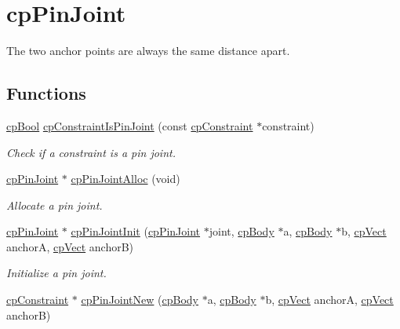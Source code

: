 \hypertarget{group__cp_pin_joint}{}\section{cp\+Pin\+Joint}
\label{group__cp_pin_joint}


The two anchor points are always the same distance apart.  


\subsection*{Functions}
\begin{DoxyCompactItemize}
\item 
\hypertarget{group__cp_pin_joint_ga1bfadaf29642d5a71302cf958e4969cb}{}\hyperlink{group__basic_types_gabc5e752c48f3449ca26ef413ecbd647e}{cp\+Bool} \hyperlink{group__cp_pin_joint_ga1bfadaf29642d5a71302cf958e4969cb}{cp\+Constraint\+Is\+Pin\+Joint} (const \hyperlink{structcp_constraint}{cp\+Constraint} $\ast$constraint)\label{group__cp_pin_joint_ga1bfadaf29642d5a71302cf958e4969cb}

\begin{DoxyCompactList}\small\item\em Check if a constraint is a pin joint. \end{DoxyCompactList}\item 
\hypertarget{group__cp_pin_joint_ga12e5fcaa7d39e47e6f1ac9777744fec5}{}\hyperlink{structcp_pin_joint}{cp\+Pin\+Joint} $\ast$ \hyperlink{group__cp_pin_joint_ga12e5fcaa7d39e47e6f1ac9777744fec5}{cp\+Pin\+Joint\+Alloc} (void)\label{group__cp_pin_joint_ga12e5fcaa7d39e47e6f1ac9777744fec5}

\begin{DoxyCompactList}\small\item\em Allocate a pin joint. \end{DoxyCompactList}\item 
\hypertarget{group__cp_pin_joint_ga0f7cc8d23e3bc0695086d44447efd95c}{}\hyperlink{structcp_pin_joint}{cp\+Pin\+Joint} $\ast$ \hyperlink{group__cp_pin_joint_ga0f7cc8d23e3bc0695086d44447efd95c}{cp\+Pin\+Joint\+Init} (\hyperlink{structcp_pin_joint}{cp\+Pin\+Joint} $\ast$joint, \hyperlink{structcp_body}{cp\+Body} $\ast$a, \hyperlink{structcp_body}{cp\+Body} $\ast$b, \hyperlink{structcp_vect}{cp\+Vect} anchor\+A, \hyperlink{structcp_vect}{cp\+Vect} anchor\+B)\label{group__cp_pin_joint_ga0f7cc8d23e3bc0695086d44447efd95c}

\begin{DoxyCompactList}\small\item\em Initialize a pin joint. \end{DoxyCompactList}\item 
\hypertarget{group__cp_pin_joint_ga8f0880764b29094c3a6fccd857a2d77d}{}\hyperlink{structcp_constraint}{cp\+Constraint} $\ast$ \hyperlink{group__cp_pin_joint_ga8f0880764b29094c3a6fccd857a2d77d}{cp\+Pin\+Joint\+New} (\hyperlink{structcp_body}{cp\+Body} $\ast$a, \hyperlink{structcp_body}{cp\+Body} $\ast$b, \hyperlink{structcp_vect}{cp\+Vect} anchor\+A, \hyperlink{structcp_vect}{cp\+Vect} anchor\+B)\label{group__cp_pin_joint_ga8f0880764b29094c3a6fccd857a2d77d}


\end{DoxyCompactItemize}
